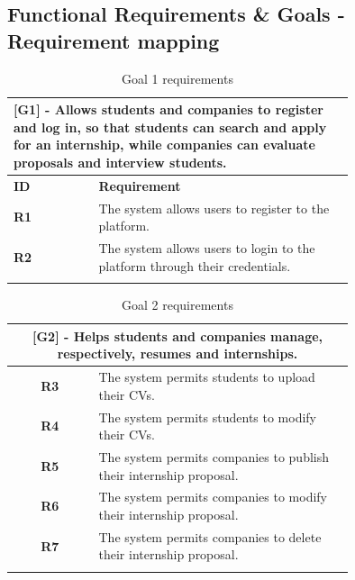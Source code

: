 \documentclass[12pt]{article}
\numberwithin{figure}{section}
\numberwithin{table}{section}
\begin{document}
\newpage
\subsection{Functional Requirements \& Goals - Requirement mapping}

    \begin{center}
        \begin{longtable}{|l|p{0.75\linewidth}|}
            \hline
            \multicolumn{2}{|p{0.75\linewidth}|}{\textbf{[G1] - Allows students and companies to register and log in, so that students can search and apply for an internship, while companies can evaluate proposals and interview students.}} \\
            \hline
            \textbf{ID} & \textbf{Requirement}  \\
            \hline
            \textbf{R1} & The system allows users to register to the platform. \\
            \hline
            \textbf{R2} & The system allows users to login to the platform through their credentials. \\
            \hline
            \caption{Goal 1 requirements}
        \end{longtable}
    \end{center}

    \begin{center}
        \begin{longtable}{|c|p{0.75\linewidth}|}
            \hline
            \multicolumn{2}{|p{0.75\linewidth}|}{\textbf{[G2] - Helps students and companies manage, respectively, resumes and internships.}} \\
            \hline
            \textbf{R3} & The system permits students to upload their CVs. \\
            \hline
            \textbf{R4} & The system permits students to modify their CVs. \\
            \hline
            \textbf{R5} & The system permits companies to publish their internship proposal. \\
            \hline
            \textbf{R6} & The system permits companies to modify their internship proposal. \\
            \hline
            \textbf{R7} & The system permits companies to delete their internship proposal. \\
            \hline
            \caption{Goal 2 requirements}
        \end{longtable}
    \end{center}
\end{document}
